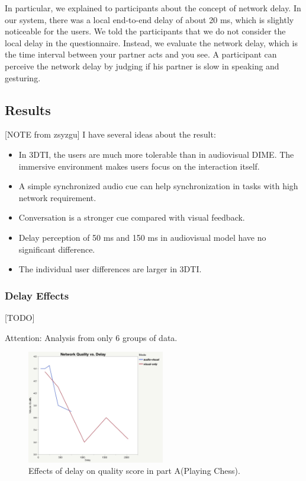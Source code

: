 In particular, we explained to participants about the concept of network delay. In our system, there was a local end-to-end delay of about 20 ms, which is slightly noticeable for the users. We told the participants that we do not consider the local delay in the questionnaire. Instead, we evaluate the network delay, which is the time interval between your partner acts and you see. A participant can perceive the network delay by judging if his partner is slow in speaking and gesturing.

\subsection{Results}


[NOTE from zsyzgu] I have several ideas about the result:

\begin{itemize}
    \item In 3DTI, the users are much more tolerable than in audiovisual DIME. The immersive environment makes users focus on the interaction itself.
    \item A simple synchronized audio cue can help synchronization in tasks with high network requirement.
    \item Conversation is a stronger cue compared with visual feedback.
    \item Delay perception of 50 ms and 150 ms in audiovisual model have no significant difference.
    \item The individual user differences are larger in 3DTI.
\end{itemize}


\subsubsection{Delay Effects}[TODO]

Attention: Analysis from only 6 groups of data.

\begin{figure}[H]
\centering
\includegraphics[width=6cm]{figures/figure_experiment1_NQ.jpg}
\setlength{\abovecaptionskip}{0.5cm}
\caption{Effects of delay on quality score in part A(Playing Chess).}
\label{4}
\end{figure}

